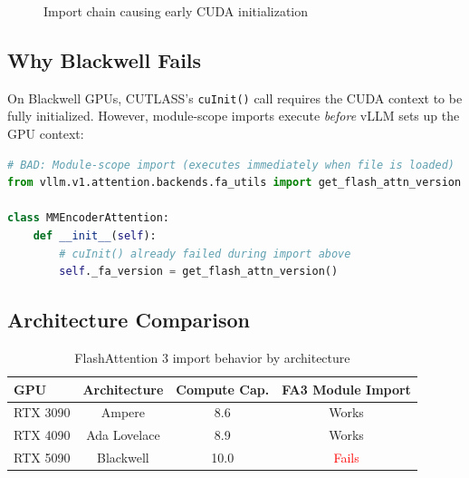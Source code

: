 \documentclass[10pt,letterpaper]{article}
\begin{document}
\begin{figure}[H]
\centering
{}
\caption{Import chain causing early CUDA initialization}
\end{figure}

\subsection{Why Blackwell Fails}

On Blackwell GPUs, CUTLASS's \texttt{cuInit()} call requires the CUDA context to be fully initialized. However, module-scope imports execute \textit{before} vLLM sets up the GPU context:

\begin{lstlisting}[language=Python]
# BAD: Module-scope import (executes immediately when file is loaded)
from vllm.v1.attention.backends.fa_utils import get_flash_attn_version

class MMEncoderAttention:
    def __init__(self):
        # cuInit() already failed during import above
        self._fa_version = get_flash_attn_version()
\end{lstlisting}

\subsection{Architecture Comparison}

\begin{table}[H]
\centering
\small
\begin{tabular}{@{}lccc@{}}
\toprule
\textbf{GPU} & \textbf{Architecture} & \textbf{Compute Cap.} & \textbf{FA3 Module Import} \\
\midrule
RTX 3090 & Ampere & 8.6 & Works \\
RTX 4090 & Ada Lovelace & 8.9 & Works \\
RTX 5090 & Blackwell & 10.0 & \textcolor{red}{Fails} \\
\bottomrule
\end{tabular}
\caption{FlashAttention 3 import behavior by architecture}
\end{table}
\end{document}
